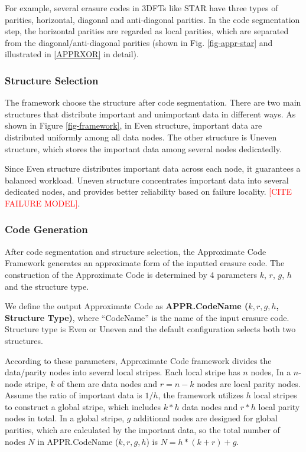 \documentclass[sigconf]{acmart}
\begin{document}
For example, several erasure codes in 3DFTs like STAR have three types of parities, horizontal, diagonal and anti-diagonal parities. In the code segmentation step, the horizontal parities are regarded as local parities, which are separated from the diagonal/anti-diagonal parities (shown in Fig. \ref{fig-appr-star} and illustrated in \ref{APPRXOR} in detail).

\subsubsection{Structure Selection}
The framework choose the structure after code segmentation.
There are two main structures that distribute important and unimportant data in different ways.
As shown in Figure \ref{fig-framework}, in Even structure, important data are distributed uniformly among all data nodes. The other structure is Uneven structure, which stores the important data among several nodes dedicatedly.

Since Even structure distributes important data across each node, it guarantees a balanced workload. Uneven structure concentrates important data into several dedicated nodes, and provides better reliability based on failure locality. \textcolor{red}{[CITE FAILURE MODEL]}.

\subsubsection{Code Generation}\label{code-gen}
After code segmentation and structure selection, the Approximate Code Framework generates an approximate form of the inputted erasure code.
The construction of the Approximate Code is determined by 4 parameters $k$, $r$, $g$, $h$ and the structure type.

We define the output Approximate Code as \textbf{APPR.CodeName ($k,r,g,h$, Structure Type)}, where ``CodeName'' is the name of the input erasure code. Structure type is Even or Uneven and the default configuration selects both two structures.

According to these parameters, Approximate Code framework divides the data/parity nodes into several local stripes. Each local stripe has $n$ nodes,  
In a $n$-node stripe, $k$ of them are data nodes and $r=n-k$ nodes are local parity nodes.
Assume the ratio of important data is $1/h$, the framework utilizes $h$ local stripes to construct a global stripe, which includes $k*h$ data nodes and $r*h$ local parity nodes in total.
In a global stripe, $g$ additional nodes are designed for global parities, which are calculated by the important data, so the total number of nodes $N$ in APPR.CodeName ($k,r,g,h$) is
$N= h*(k+r) + g$.
\end{document}
